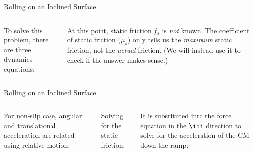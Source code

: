 \documentclass[12pt,compress,aspectratio=169]{beamer}
\begin{document}
\begin{frame}{Rolling on an Inclined Surface}
  \begin{columns}
    

    To solve this problem, there are three dynamics equations:

    \vspace{-.3in}{\large
      \begin{align*}
        \sum F_x&=mg\sin\phi-f_s=ma\\
        \sum F_y&=N-mg\cos\phi=0\\
        \sum\tau &=Rf_s=I\alpha
      \end{align*}
    }
    
    At this point, static friction $f_s$ is \emph{not} known. The coefficient
    of static friction ($\mu_s$) only tells us the \emph{maximum} static
    friction, not the \emph{actual} friction. (We will instead use it to check
    if the answer makes sense.)
  \end{columns}
\end{frame}



\begin{frame}{Rolling on an Inclined Surface}
  \begin{columns}
    

    For non-slip case, angular and translational acceleration are related using
    relative motion:

    
    \vspace{-.22in}Solving for the static friction:


    \vspace{-.1in}It is substituted into the force equation in the $\iii$
    direction to solve for the acceleration of the CM down the ramp:

  \end{columns}
\end{frame}
\end{document}
